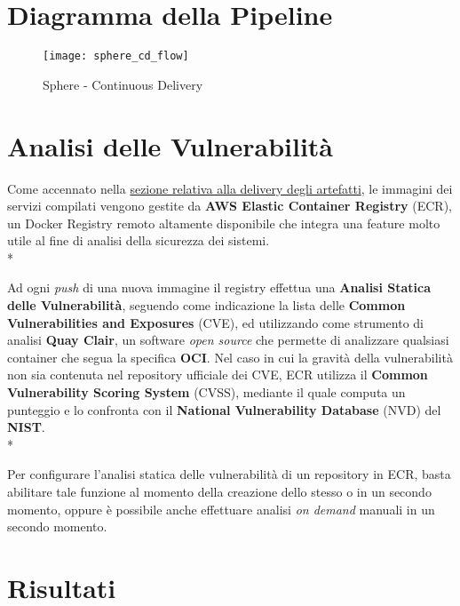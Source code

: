 \documentclass[../main.tex]{subfiles}
\begin{document}
    	\section{Diagramma della Pipeline}
    	
    	    \begin{figure}[H]
    			\centering
    			\texttt{[image: sphere\_cd\_flow]}
    			\caption{Sphere - Continuous Delivery}
    			\label{fig:sphere_cd_flow}
    	    \end{figure}
    	
    	\section{Analisi delle Vulnerabilità}
    	
    	    Come accennato nella \hyperref[sec:sphere_cd_docker]{sezione relativa alla delivery degli artefatti}, le immagini dei servizi compilati vengono gestite da \textbf{AWS Elastic Container Registry} (ECR), un Docker Registry remoto altamente disponibile che integra una feature molto utile al fine di analisi della sicurezza dei sistemi.\\*
    	    
    	    Ad ogni \emph{push} di una nuova immagine il registry effettua una \textbf{Analisi Statica delle Vulnerabilità}, seguendo come indicazione la lista delle \textbf{Common Vulnerabilities and Exposures}\cite{cve} (CVE), ed utilizzando come strumento di analisi \textbf{Quay Clair}\cite{quay_clair}, un software \emph{open source} che permette di analizzare qualsiasi container che segua la specifica \textbf{OCI}. Nel caso in cui la gravità della vulnerabilità non sia contenuta nel repository ufficiale dei CVE, ECR utilizza il \textbf{Common Vulnerability Scoring System}\cite{cvss} (CVSS), mediante il quale computa un punteggio e lo confronta con il \textbf{National Vulnerability Database}\cite{nist_nvd} (NVD) del \textbf{NIST}.\\*
    	    
    	    Per configurare l'analisi statica delle vulnerabilità di un repository in ECR, basta abilitare tale funzione al momento della creazione dello stesso o in un secondo momento, oppure è possibile anche effettuare analisi \emph{on demand} manuali in un secondo momento.
    	
    	\section{Risultati}
    	
\end{document}
